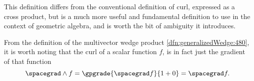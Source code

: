 %
%
This definition differs from the conventional definition of  curl, expressed as a cross product, but is a much more useful and fundamental definition to use in the context of geometric algebra, and is worth the bit of ambiguity it introduces.

From the definition of the multivector wedge product \cref{dfn:generalizedWedge:480}, it is worth noting that
the curl of a scalar function \( f \), is in fact just the gradient of that function
\begin{equation}\label{eqn:vectorcalc:200}
\spacegrad \wedge f = \gpgrade{\spacegrad f}{1+0} = \spacegrad f.
\end{equation}
